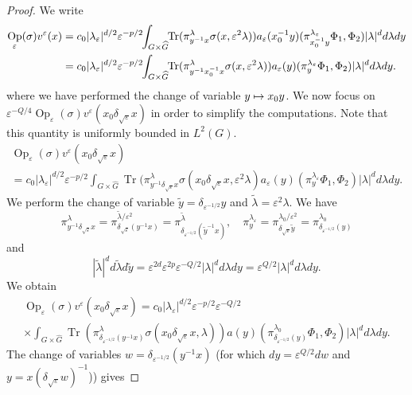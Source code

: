 \documentclass[JEP,XML,SOM,Unicode,published]{cedram}
\newcommand\mto{\mathchoice{\longmapsto}{\mapsto}{\mapsto}{\mapsto}}
\DeclareMathOperator{\Op}{Op}
\DeclareMathOperator{\Tr}{Tr}
\theoremstyle{plain}
\theoremstyle{definition}
\let\eps\varepsilon
\begin{document}
\begin{proof}
We write
\begin{align*}
\Op_\eps(\sigma) v^\eps(x) &=c_0|\lambda_\eps|^{d/2} \eps^{-p/2}
\hspace*{-1mm}\int_{G\times \widehat G}\hspace*{-1mm} \Tr (\pi^\lambda_{y^{-1} x}\sigma(x,\eps^2\lambda))
a_\eps(x_0^{-1}y) (\pi_{x_0^{-1}y}^{\lambda_\eps} \Phi_1,\Phi_2) |\lambda|^d d\lambda dy\\
&= c_0|\lambda_\eps|^{d/2} \eps^{-p/2}
\hspace*{-1mm}\int_{G\times \widehat G}\hspace*{-1mm} \Tr (\pi^\lambda_{y^{-1} x_0^{-1} x}\sigma(x,\eps^2\lambda))
a_\eps(y) (\pi_{y}^{\lambda_\eps} \Phi_1,\Phi_2) |\lambda|^d d\lambda dy.
\end{align*}
where we have performed the change of variable $y\mto x_0y$. We now focus on $\eps^{-Q/4}\Op_\eps(\sigma) v^\eps(x_0\delta_{\sqrt\eps} x)$ in order to simplify the computations. Note that this quantity is uniformly bounded in $L^2(G)$.
\begin{multline*}
\Op_\eps(\sigma) v^\eps(x_0\delta_{\sqrt\eps}x)\\
= c_0 |\lambda_\eps|^{d/2}\eps^{-p/2}
\int_{G\times \widehat G} \Tr (\pi^\lambda_{y^{-1} \delta_{\sqrt\eps} x}\sigma(x_0 \delta_{\sqrt\eps} x,\eps^2\lambda)
a_\eps(y) (\pi_{y}^{\lambda_\eps} \Phi_1,\Phi_2) |\lambda|^d d\lambda dy.
\end{multline*}
We perform the change of variable $\widetilde y = \delta_{\eps^{-1/2}} y$ and $\widetilde\lambda= \eps^2 \lambda$.
We have
\[
\pi^{\lambda} _{y^{-1} \delta_{\sqrt\eps} x}= \pi^{\widetilde \lambda/\eps^2}_{\delta_{\sqrt\eps}(y^{-1} x)}=
\pi^{\widetilde\lambda}_{\delta_{\eps^{-1/2}} (\widetilde y ^{-1}x)},
\quad
\pi^{\lambda_\eps}_y= \pi^{\lambda_0/\eps^2}_{ \delta _{\sqrt\eps}\widetilde y} = \pi^{\lambda_0} _{ \delta_{\eps^{-1/2}} (y)}
\]
and
\[
|\widetilde\lambda|^d d\widetilde \lambda d\widetilde y = \eps^{2d}\eps^{2p} \eps^{-Q/2} |\lambda|^d d\lambda dy= \eps^{Q/2} |\lambda|^dd\lambda dy.
\]
We obtain
\begin{multline*}
\Op_\eps(\sigma) v^\eps(x_0\delta_{\sqrt\eps} x) = c_0|\lambda_\eps|^{d/2}\eps^{-p/2}\eps^{-Q/2} \\
\times \int_{G\times \widehat G} \Tr (\pi^{\lambda}_{ \delta_{\eps^{-1/2}} (y^{-1} x)}\sigma(x_0\delta_{\sqrt\eps} x,\lambda))
a(y) (\pi_{\delta_{\eps^{-1/2}}(y)}^{\lambda_0} \Phi_1,\Phi_2) |\lambda|^d d\lambda dy.
\end{multline*}
The change of variables $w\!=\!\delta_{\eps^{-1/2}} (y^{-1} x)$ (for which $dy\!=\! \eps^{Q/2} dw$ and $y\!=\!x(\delta_{\sqrt\eps }w)^{-1}$)) gives

\end{proof}
\end{document}
